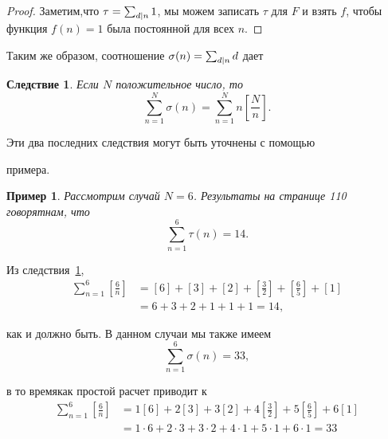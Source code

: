 \documentclass[11pt]{article}
\newtheorem{corollary}{Следствие}
\newtheorem{example}{Пример}
\begin{document}
\begin{proof}
	Заметим,что $ \tau=\sum_{\tiny d|n}1 $, мы можем записать $ \tau $ для $ F $ и взять $ f $, чтобы функция $ f(n)=1 $ была постоянной для всех $ n $.
\end{proof}
Таким же образом, соотношение $\sigma(n)=\sum_{\tiny d|n}d $ дает
\begin{corollary} \label{corollary1}
	Если $ N $ положительное число, то \[\sum_{n=1}^{N}\sigma(n)=\sum_{n=1}^{N}n\left[\frac{N}{n}\right].\] 
\end{corollary}
Эти два последних следствия могут быть
уточнены с помощью 

примера. 

\begin{example} 
	Рассмотрим случай $ N=6 $. Результаты на странице 110 говорятнам, что \[\sum_{n=1}^{6}\tau(n)=14.\] 
\end{example}

Из следствия~\ref{corollary1},
\begin{equation*} \label{eq1}
\begin{split}
\sum_{n=1}^{6}\left[ \frac{6}{n}\right]&=\left[ 6\right] +\left[ 3\right] +\left[ 2\right] +\left[ \frac{3}{2}\right] +\left[ \frac{6}{5}\right] +\left[ 1\right]\\
&=6+3+2+1+1+1=14,
\end{split}
\end{equation*}

как и должно быть. В данном случаи мы также имеем
\[\sum_{n=1}^{6}\sigma(n)=33,\]

в то времякак простой расчет приводит к 
\begin{equation*} \label{eq2}
\begin{split}
\sum_{n=1}^{6}\left[ \frac{6}{n}\right]&=1\left[ 6\right] +2\left[ 3\right] +3\left[ 2\right] +4\left[ \frac{3}{2}\right] +5\left[ \frac{6}{5}\right] +6\left[ 1\right]\\
&=1\cdot6+2\cdot3+3\cdot2+4\cdot1+5\cdot1+6\cdot1=33
\end{split}
\end{equation*}
\end{document}
